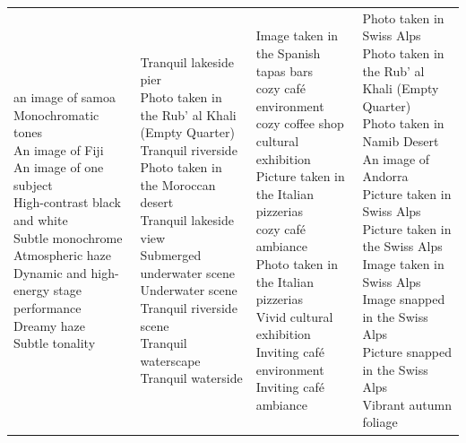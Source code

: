 \documentclass{article}
\begin{document}
\begin{table}[htbp]
\begin{tabular}{|p{4.0cm}|p{4.0cm}|p{4.0cm}|p{4.0cm}|}
\hline
\makecell[t]{an image of samoa \\ Monochromatic tones \\ An image of Fiji \\ An image of one subject \\ High-contrast black and white \\ Subtle monochrome \\ Atmospheric haze \\ Dynamic and high-energy stage performance \\ Dreamy haze \\ Subtle tonality} & \makecell[t]{Tranquil lakeside pier \\ Photo taken in the Rub' al Khali (Empty Quarter) \\ Tranquil riverside \\ Photo taken in the Moroccan desert \\ Tranquil lakeside view \\ Submerged underwater scene \\ Underwater scene \\ Tranquil riverside scene \\ Tranquil waterscape \\ Tranquil waterside} & \makecell[t]{Image taken in the Spanish tapas bars \\ cozy café environment \\ cozy coffee shop \\ cultural exhibition \\ Picture taken in the Italian pizzerias \\ cozy café ambiance \\ Photo taken in the Italian pizzerias \\ Vivid cultural exhibition \\ Inviting café environment \\ Inviting café ambiance} & \makecell[t]{Photo taken in Swiss Alps \\ Photo taken in the Rub' al Khali (Empty Quarter) \\ Photo taken in Namib Desert \\ An image of Andorra \\ Picture taken in Swiss Alps \\ Picture taken in the Swiss Alps \\ Image taken in Swiss Alps \\ Image snapped in the Swiss Alps \\ Picture snapped in the Swiss Alps \\ Vibrant autumn foliage} \\

\end{tabular}
\end{table}
\end{document}
